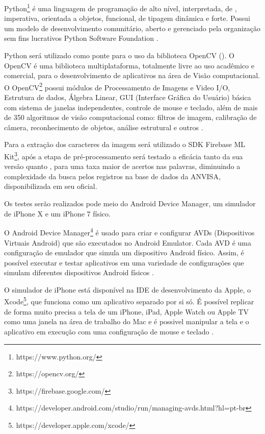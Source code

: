 Python\footnote{https://www.python.org/} é uma linguagem de programação de alto nível, interpretada, de , imperativa, orientada a objetos, funcional, de tipagem dinâmica e forte. Possui um modelo de desenvolvimento comunitário, aberto e gerenciado pela organização sem fins lucrativos Python Software Foundation \cite{PYTHON}.

Python será utilizado como ponte para o uso da biblioteca OpenCV (). O OpenCV é uma biblioteca multiplataforma, totalmente livre ao uso acadêmico e comercial, para o desenvolvimento de   aplicativos na área de Visão computacional. O OpenCV\footnote{https://opencv.org/}
possui módulos de Processamento de Imagens e Video I/O, Estrutura de dados, Álgebra Linear, GUI (Interface Gráfica do Usuário) básica com sistema de janelas independentes, controle de mouse e teclado, além de mais de 350 algoritmos de visão computacional como: filtros de imagem, calibração de câmera, reconhecimento de objetos, análise estrutural e outros \cite{RVOPENCV}. 

Para a extração dos caracteres da imagem será utilizado o SDK Firebase ML Kit\footnote{https://firebase.google.com/}, após a etapa de pré-processamento será testado a eficácia tanto da sua versão  quanto , para uma taxa maior de acertos nas palavras, diminuindo a complexidade da busca pelos registros na base de dados da ANVISA, disponibilizada em seu  oficial.

Os testes serão realizados pode meio do Android Device Manager, um simulador de iPhone X e um iPhone 7 físico. 

O Android Device Manager\footnote{https://developer.android.com/studio/run/managing-avds.html?hl=pt-br} é usado para criar e configurar AVDs (Dispositivos Virtuais Android) que são executados no Android Emulator. Cada AVD é uma configuração de emulador que simula um dispositivo Android físico. Assim, é possível executar e testar aplicativos em uma variedade de configurações que simulam diferentes dispositivos Android físicos  \cite{ADVDUNN}.

O simulador de iPhone está disponível na IDE de desenvolvimento da Apple, o Xcode\footnote{https://developer.apple.com/xcode/}, que funciona como um aplicativo separado por si só. É possível replicar de forma muito precisa a tela de um iPhone, iPad, Apple Watch ou Apple TV como uma janela na área de trabalho do Mac e é possivel manipular a tela e o aplicativo em execução com uma configuração de mouse e teclado \cite{IPHONESIMULATOR}.

